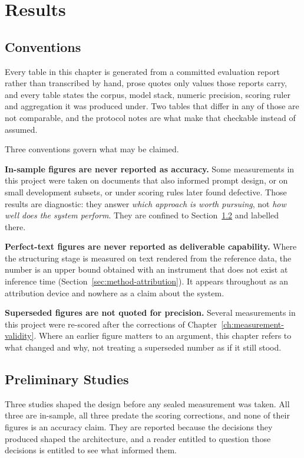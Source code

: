 \chapter{Results}
\label{ch:results}

\section{Conventions}
\label{sec:results-reading}

Every table in this chapter is generated from a committed evaluation report rather than
transcribed by hand, prose quotes only values those reports carry, and every table states
the corpus, model stack, numeric precision, scoring ruler and aggregation it was produced
under. Two tables that differ in any of those are not
comparable, and the protocol notes are what make that checkable instead of assumed.

Three conventions govern what may be claimed.

\textbf{In-sample figures are never reported as accuracy.} Some measurements in this project
were taken on documents that also informed prompt design, or on small development subsets, or
under scoring rules later found defective. Those results are diagnostic: they answer
\emph{which approach is worth pursuing}, not \emph{how well does the system perform}. They are
confined to Section~\ref{sec:results-preliminary} and labelled there.

\textbf{Perfect-text figures are never reported as deliverable capability.} Where the
structuring stage is measured on text rendered from the reference data, the number is an upper
bound obtained with an instrument that does not exist at inference time
(Section~\ref{sec:method-attribution}). It appears throughout as an attribution device and nowhere as
a claim about the system.

\textbf{Superseded figures are not quoted for precision.} Several measurements in this project
were re-scored after the corrections of Chapter~\ref{ch:measurement-validity}. Where an earlier
figure matters to an argument, this chapter refers to what changed and why, not treating
a superseded number as if it still stood.

\section{Preliminary Studies}
\label{sec:results-preliminary}

Three studies shaped the design before any sealed measurement was taken. All three are
in-sample, all three predate the scoring corrections, and none of their figures is an accuracy
claim. They are reported because the decisions they produced shaped the architecture, and a reader
entitled to question those decisions is entitled to see what informed them.

